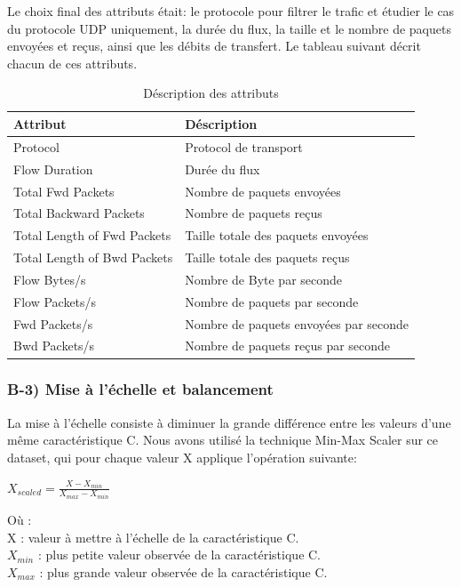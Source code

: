 \begin{table}[h]
\begin{center}
\noindent Le choix final des attributs était: le protocole pour filtrer le trafic et étudier le cas du protocole UDP uniquement, la durée du flux, la taille et le nombre de paquets envoyées et reçus, ainsi que les débits de transfert. Le tableau suivant décrit chacun de ces attributs.
\begin{table}[h]
\begin{center}
\begin{tabular}{ | m{4cm} | m{10cm} | }
\hline
\rowcolor[rgb]{0.85,0.85,0.85}
\textbf{Attribut} & \textbf{Déscription}\\
\hline
Protocol & Protocol de transport\\
\hline
Flow Duration & Durée du flux\\
\hline
Total Fwd Packets & Nombre de paquets envoyées \\
\hline
Total Backward Packets &  Nombre de paquets reçus \\
\hline
Total Length of Fwd Packets & Taille totale des paquets envoyées \\
\hline
Total Length of Bwd Packets & Taille totale des paquets reçus \\
\hline
Flow Bytes/s &  Nombre de Byte par seconde\\ 
\hline
Flow Packets/s &  Nombre de paquets par seconde\\
\hline
Fwd Packets/s & Nombre de paquets envoyées par seconde \\
\hline
Bwd Packets/s & Nombre de paquets reçus par seconde \\
\hline
\end{tabular}
\caption{Déscription des attributs}
\label{table:attributs}
\end{center}
\end{table}

\newpage
\subsubsection{B-3) Mise à l'échelle et balancement}
La mise à l'échelle consiste à diminuer la grande différence entre les valeurs d'une même caractéristique C. Nous avons utilisé la technique Min-Max Scaler sur ce dataset, qui pour chaque valeur X applique l'opération suivante:
\begin{center}
{\large $ X_{scaled} = \frac{X - X_{min}}{X_{max} - X_{min}} $}
\end{center}
Où :\\
\indent X : valeur à mettre à l'échelle de la caractéristique C.\\
\indent $X_{min}$ : plus petite valeur observée de la caractéristique C.\\
\indent $X_{max}$ : plus grande valeur observée de la caractéristique C.\\


\end{center}
\end{table}
